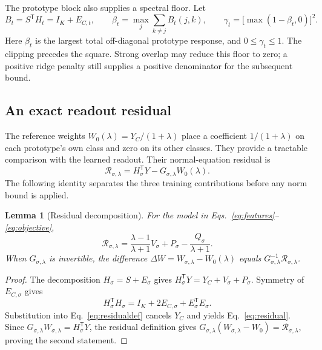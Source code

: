 \documentclass[preprint,12pt,authoryear]{elsarticle}
\newtheorem{lemma}{Lemma}
\newcommand{\tr}{\mathsf{T}}
\begin{document}
The prototype block also supplies a spectral floor. Let
\begin{equation}
 B_t=S^\tr H_t=I_K+E_{C,t},\qquad
 \beta_t=\max_j\sum_{k\ne j}B_t(j,k),\qquad
 \gamma_t=\bigl[\max(1-\beta_t,0)\bigr]^2.
 \label{eq:spectral}
\end{equation}
Here $\beta_t$ is the largest total off-diagonal prototype response, and $0\leq\gamma_t\leq1$. The clipping precedes the square. Strong overlap may reduce this floor to zero; a positive ridge penalty still supplies a positive denominator for the subsequent bound.

\subsection{An exact readout residual}
The reference weights $W_0(\lambda)=Y_C/(1+\lambda)$ place a coefficient $1/(1+\lambda)$ on each prototype's own class and zero on its other classes. They provide a tractable comparison with the learned readout. Their normal-equation residual is
\begin{equation}
 \mathcal R_{\sigma,\lambda}
 =H_\sigma^\tr Y-G_{\sigma,\lambda}W_0(\lambda).
 \label{eq:residualdef}
\end{equation}
The following identity separates the three training contributions before any norm bound is applied.

\begin{lemma}[Residual decomposition]
For the model in Eqs.~\eqref{eq:features}--\eqref{eq:objective},
\begin{equation}
 \mathcal R_{\sigma,\lambda}
 =\frac{\lambda-1}{\lambda+1}V_\sigma
   +P_\sigma-\frac{Q_\sigma}{\lambda+1}.
 \label{eq:residual}
\end{equation}
When $G_{\sigma,\lambda}$ is invertible, the difference $\Delta W=W_{\sigma,\lambda}-W_0(\lambda)$ equals $G_{\sigma,\lambda}^{-1}\mathcal R_{\sigma,\lambda}$.
\end{lemma}
\begin{proof}
The decomposition $H_\sigma=S+E_\sigma$ gives $H_\sigma^\tr Y=Y_C+V_\sigma+P_\sigma$. Symmetry of $E_{C,\sigma}$ gives
\[
 H_\sigma^\tr H_\sigma
 =I_K+2E_{C,\sigma}+E_\sigma^\tr E_\sigma.
\]
Substitution into Eq.~\eqref{eq:residualdef} cancels $Y_C$ and yields Eq.~\eqref{eq:residual}. Since $G_{\sigma,\lambda}W_{\sigma,\lambda}=H_\sigma^\tr Y$, the residual definition gives $G_{\sigma,\lambda}(W_{\sigma,\lambda}-W_0)=\mathcal R_{\sigma,\lambda}$, proving the second statement.
\end{proof}
\end{document}
